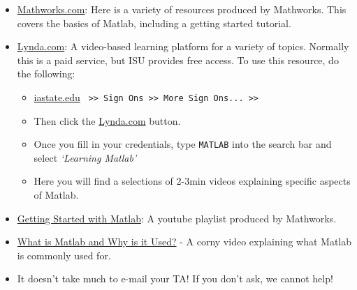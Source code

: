 \documentclass[11pt, letterpaper]{article}
\begin{document}
\begin{itemize}
    \setlength\itemsep{0.5em}    

    \item \href{https://www.mathworks.com/help/matlab/getting-started-with-matlab.html}{Mathworks.com}: Here is a variety of resources produced by Mathworks. This covers the basics of Matlab, including a getting started tutorial.

    \item  \href{https://weblogin.iastate.edu/cgi-bin/index.cgi}{Lynda.com}: A video-based learning platform for a variety of topics. Normally this is a paid service, but ISU provides free access. To use this resource, do the following:

\begin{itemize}
    \setlength\itemsep{0.5em}
    \item \href{http://www.iastate.edu}{iastate.edu} \texttt{ >> Sign Ons >> More Sign Ons... >>}
    \item Then click the \href{https://weblogin.iastate.edu/cgi-bin/index.cgi}{Lynda.com} button.
    \item Once you fill in your credentials, type \texttt{MATLAB} into the search bar and select \textit{`Learning Matlab'}
    \item Here you will find a selections of 2-3min videos explaining specific aspects of Matlab.
\end{itemize}

\item \href{https://www.youtube.com/watch?v=wqxwIk3vzkI&list=PL7CAABC40B2825C8B}{Getting Started with Matlab}: A youtube playlist produced by Mathworks.

\item \href{https://www.youtube.com/watch?v=IoiB16fg3tQ}{What is Matlab and Why is it Used?} - A corny video explaining what Matlab is commonly used for.

\end{itemize}

\vspace{10mm}
\begin{itemize}
\item {} It doesn't take much to e-mail your TA! If you don't ask, we cannot help!
\end{itemize}
\end{document}
